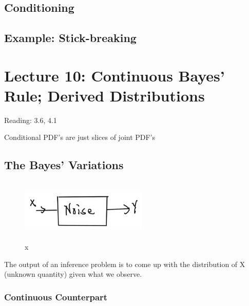 \documentclass{article}
\begin{document}
\subsection{Conditioning}


\subsection{Example: Stick-breaking}



\section{Lecture 10: Continuous Bayes' Rule; Derived Distributions}


Reading: 3.6, 4.1

Conditional PDF's are just slices of joint PDF's

\subsection{The Bayes' Variations}


\begin{figure}[h]
\centering
\includegraphics[width=6cm, height=3cm]{images/L10/noise_model.jpeg}
\caption{x}
\end{figure}


The output of an inference problem is to come up with the distribution of X (unknown quantity) given what we observe.

\subsubsection{Continuous Counterpart}
\end{document}
